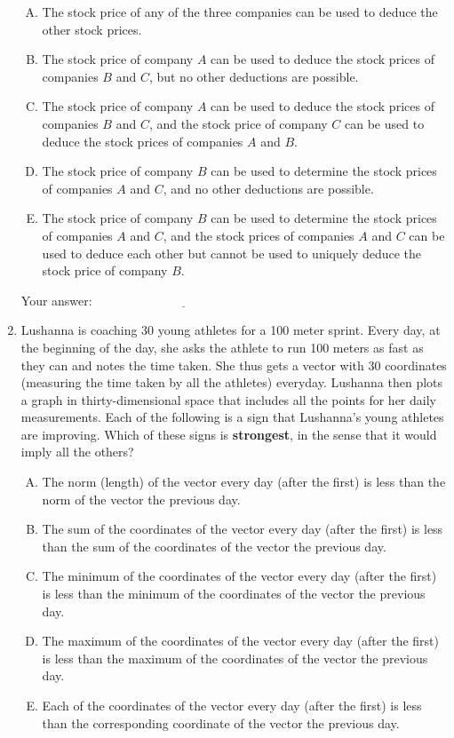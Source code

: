 \documentclass[10pt]{amsart}
\begin{document}
\begin{enumerate}
  \begin{enumerate}[(A)]
  \item The stock price of any of the three companies can be used to
    deduce the other stock prices.
  \item The stock price of company $A$ can be used to deduce the stock
    prices of companies $B$ and $C$, but no other deductions are possible.
  \item The stock price of company $A$ can be used to deduce the stock
    prices of companies $B$ and $C$, and the stock price of company
    $C$ can be used to deduce the stock prices of companies $A$ and
    $B$.
  \item The stock price of company $B$ can be used to determine the
    stock prices of companies $A$ and $C$, and no other deductions are
    possible.
  \item The stock price of company $B$ can be used to determine the
    stock prices of companies $A$ and $C$, and the stock prices of
    companies $A$ and $C$ can be used to deduce each other but cannot
    be used to uniquely deduce the stock price of company $B$.
  \end{enumerate}

  \vspace{0.1in}
  Your answer: $\underline{\qquad\qquad\qquad\qquad\qquad\qquad\qquad}$
  \vspace{0.1in}

\item Lushanna is coaching $30$ young athletes for a 100 meter
  sprint. Every day, at the beginning of the day, she asks the athlete
  to run 100 meters as fast as they can and notes the time taken. She
  thus gets a vector with $30$ coordinates (measuring the time taken
  by all the athletes) everyday. Lushanna then plots a graph in
  thirty-dimensional space that includes all the points for her daily
  measurements. Each of the following is a sign that Lushanna's young
  athletes are improving. Which of these signs is {\bf strongest}, in
  the sense that it would imply all the others?

  \begin{enumerate}[(A)]
  \item The norm (length) of the vector every day (after the first) is
    less than the norm of the vector the previous day.
  \item The sum of the coordinates of the vector every day (after the
    first) is less than the sum of the coordinates of the vector the
    previous day.
  \item The minimum of the coordinates of the vector every day (after
    the first) is less than the minimum of the coordinates of the
    vector the previous day.
  \item The maximum of the coordinates of the vector every day (after
    the first) is less than the maximum of the coordinates of the
    vector the previous day.
  \item Each of the coordinates of the vector every day (after the
    first) is less than the corresponding coordinate of the vector the
    previous day.
  \end{enumerate}


\end{enumerate}
\end{document}
